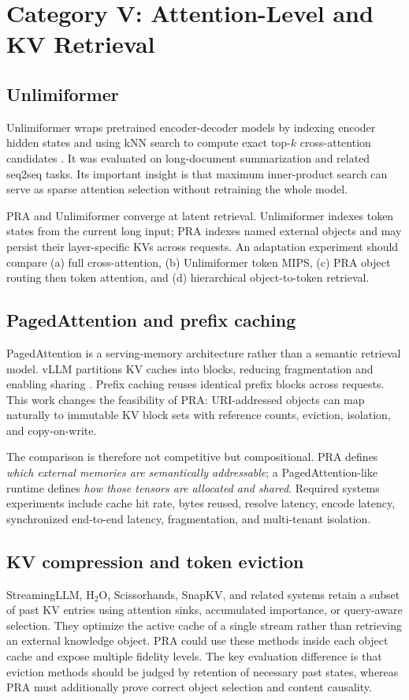 \documentclass[10pt,a4paper]{article}
\begin{document}
\section{Category V: Attention-Level and KV Retrieval}
\subsection{Unlimiformer}
Unlimiformer wraps pretrained encoder-decoder models by indexing encoder hidden states and using kNN search to compute exact top-$k$ cross-attention candidates \citep{bertsch2023unlimiformer}. It was evaluated on long-document summarization and related seq2seq tasks. Its important insight is that maximum inner-product search can serve as sparse attention selection without retraining the whole model.

PRA and Unlimiformer converge at latent retrieval. Unlimiformer indexes token states from the current long input; PRA indexes named external objects and may persist their layer-specific KVs across requests. An adaptation experiment should compare (a) full cross-attention, (b) Unlimiformer token MIPS, (c) PRA object routing then token attention, and (d) hierarchical object-to-token retrieval.

\subsection{PagedAttention and prefix caching}
PagedAttention is a serving-memory architecture rather than a semantic retrieval model. vLLM partitions KV caches into blocks, reducing fragmentation and enabling sharing \citep{kwon2023vllm}. Prefix caching reuses identical prefix blocks across requests. This work changes the feasibility of PRA: URI-addressed objects can map naturally to immutable KV block sets with reference counts, eviction, isolation, and copy-on-write.

The comparison is therefore not competitive but compositional. PRA defines \emph{which external memories are semantically addressable}; a PagedAttention-like runtime defines \emph{how those tensors are allocated and shared}. Required systems experiments include cache hit rate, bytes reused, resolve latency, encode latency, synchronized end-to-end latency, fragmentation, and multi-tenant isolation.

\subsection{KV compression and token eviction}
StreamingLLM, H$_2$O, Scissorhands, SnapKV, and related systems retain a subset of past KV entries using attention sinks, accumulated importance, or query-aware selection. They optimize the active cache of a single stream rather than retrieving an external knowledge object. PRA could use these methods inside each object cache and expose multiple fidelity levels. The key evaluation difference is that eviction methods should be judged by retention of necessary past states, whereas PRA must additionally prove correct object selection and content causality.
\end{document}

